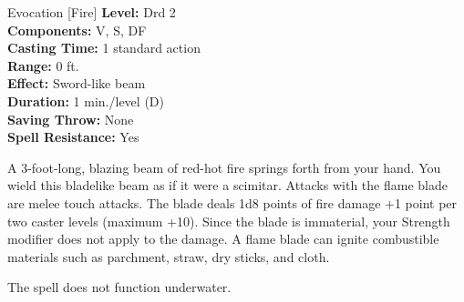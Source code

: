 {Evocation [Fire]}
{
	\textbf{Level:}
	Drd 2\\
	\textbf{Components:}
	V, S, DF\\
	\textbf{Casting Time:}
	1 standard action\\
	\textbf{Range:}
	0 ft.\\
	\textbf{Effect:}
	Sword-like beam\\
	\textbf{Duration:}
	1 min./level (D)\\
	\textbf{Saving Throw:}
	None\\
	\textbf{Spell Resistance:}
	Yes\\
}
{
	A 3-foot-long, blazing beam of red-hot fire springs forth from your hand. You wield this bladelike beam as if it were a scimitar. Attacks with the flame blade are melee touch attacks. The blade deals 1d8 points of fire damage +1 point per two caster levels (maximum +10). Since the blade is immaterial, your Strength modifier does not apply to the damage. A flame blade can ignite combustible materials such as parchment, straw, dry sticks, and cloth.

	The spell does not function underwater.

}
